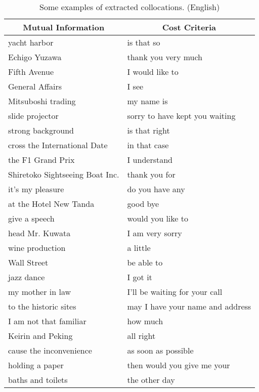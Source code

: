 \begin{table}[p]
\caption{Some examples of extracted collocations. (English) }
\label{Tab:CollocationEnglish}
\begin{center}
\begin{tabular}{p{6.5cm}|p{6.5cm}}
\hline
\multicolumn{1}{c}{Mutual Information} & \multicolumn{1}{|c}{Cost Criteria} \\
\hline
yacht harbor                    &  is that so  \\
Echigo Yuzawa                   &  thank you very much  \\
Fifth Avenue                    &  I would like to  \\
General Affairs                 &  I see  \\
Mitsuboshi trading              &  my name is  \\
slide projector                 &  sorry to have kept you waiting  \\
strong background               &  is that right  \\
cross the International Date    &  in that case  \\
the F1 Grand Prix               &  I understand  \\
Shiretoko Sightseeing Boat Inc. &  thank you for  \\
it's my pleasure                &  do you have any  \\
at the Hotel New Tanda          &  good bye  \\
give a speech                   &  would you like to  \\
head Mr. Kuwata                 &  I am very sorry  \\
wine production                 &  a little  \\
Wall Street                     &  be able to  \\
jazz dance                      &  I got it  \\
my mother in law                &  I'll be waiting for your call  \\
to the historic sites           &  may I have your name and address  \\
I am not that familiar          &  how much  \\
Keirin and Peking               &  all right  \\
cause the inconvenience         &  as soon as possible  \\
holding a paper                 &  then would you give me your  \\
baths and toilets               &  the other day  \\

\end{tabular}
\end{center}
\end{table}
